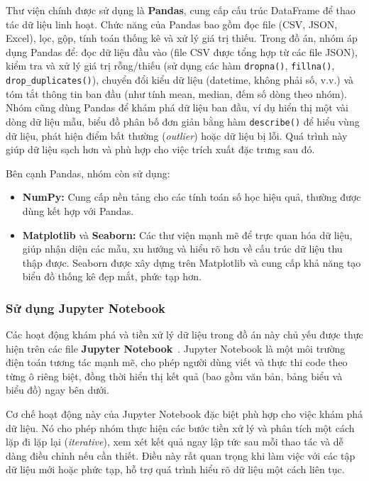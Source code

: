 Thư viện chính được sử dụng là \textbf{Pandas}, cung cấp cấu trúc DataFrame để thao tác dữ liệu linh hoạt. Chức năng của Pandas bao gồm đọc file (CSV, JSON, Excel), lọc, gộp, tính toán thống kê và xử lý giá trị thiếu. Trong đồ án, nhóm áp dụng Pandas để: đọc dữ liệu đầu vào (file CSV được tổng hợp từ các file JSON), kiểm tra và xử lý giá trị rỗng/thiếu (sử dụng các hàm \texttt{dropna()}, \texttt{fillna()}, \texttt{drop\_duplicates()}), chuyển đổi kiểu dữ liệu (datetime, không phải số, v.v.) và tóm tắt thông tin ban đầu (như tính mean, median, đếm số dòng theo nhóm). Nhóm cũng dùng Pandas để khám phá dữ liệu ban đầu, ví dụ hiển thị một vài dòng dữ liệu mẫu, biểu đồ phân bố đơn giản bằng hàm \texttt{describe()} để hiểu vùng dữ liệu, phát hiện điểm bất thường (\textit{outlier}) hoặc dữ liệu bị lỗi. Quá trình này giúp dữ liệu sạch hơn và phù hợp cho việc trích xuất đặc trưng sau đó.

Bên cạnh Pandas, nhóm còn sử dụng:
\begin{itemize}
    \item \textbf{NumPy:} Cung cấp nền tảng cho các tính toán số học hiệu quả, thường được dùng kết hợp với Pandas.
    
    \item \textbf{Matplotlib} và \textbf{Seaborn:} Các thư viện mạnh mẽ để trực quan hóa dữ liệu, giúp nhận diện các mẫu, xu hướng và hiểu rõ hơn về cấu trúc dữ liệu thu thập được. Seaborn được xây dựng trên Matplotlib và cung cấp khả năng tạo biểu đồ thống kê đẹp mắt, phức tạp hơn.
\end{itemize}

\subsubsection{Sử dụng Jupyter Notebook}

Các hoạt động khám phá và tiền xử lý dữ liệu trong đồ án này chủ yếu được thực hiện trên các file \textbf{Jupyter Notebook}~\cite{jupyter_notebook}. Jupyter Notebook là một môi trường điện toán tương tác mạnh mẽ, cho phép người dùng viết và thực thi code theo từng ô riêng biệt, đồng thời hiển thị kết quả (bao gồm văn bản, bảng biểu và biểu đồ) ngay bên dưới.

Cơ chế hoạt động này của Jupyter Notebook đặc biệt phù hợp cho việc khám phá dữ liệu. Nó cho phép nhóm thực hiện các bước tiền xử lý và phân tích một cách lặp đi lặp lại (\textit{iterative}), xem xét kết quả ngay lập tức sau mỗi thao tác và dễ dàng điều chỉnh nếu cần thiết. Điều này rất quan trọng khi làm việc với các tập dữ liệu mới hoặc phức tạp, hỗ trợ quá trình hiểu rõ dữ liệu một cách liên tục.

